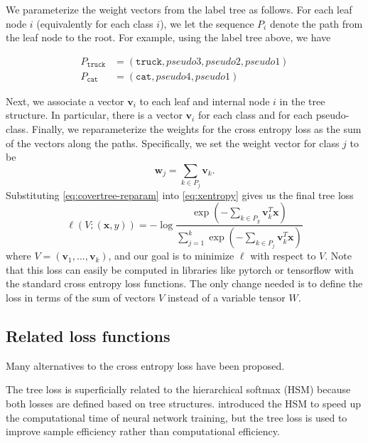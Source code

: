 \documentclass[twoside]{article}
\theoremstyle{definition}
\newcommand{\trans}[1]{{#1}^{T}}
\newcommand{\vv}{\mathbf v}
\newcommand{\w}{\mathbf w}
\newcommand{\x}{\mathbf x}
\begin{document}
We parameterize the weight vectors from the label tree as follows.
For each leaf node $i$ (equivalently for each class $i$),
we let the sequence $P_i$ denote the path from the leaf node to the root.
For example, using the label tree above,
we have

\begin{equation}
\begin{split}
    P_{\texttt{truck}} &= (\texttt{truck}, \textit{pseudo3}, \textit{pseudo2}, \textit{pseudo1} ) \\
    P_{\texttt{cat}} &= (\texttt{cat}, \textit{pseudo4}, \textit{pseudo1} )
\end{split}
\end{equation}


Next, we associate a vector $\vv_i$ to each leaf and internal node $i$ in the tree structure.
In particular, there is a vector $\vv_i$ for each class and for each pseudo-class.
Finally, we reparameterize the weights for the cross entropy loss as the sum of the vectors along the paths.
Specifically, we set the weight vector for class $j$ to be 
\begin{equation}
    \label{eq:covertree-reparam}
    \w_j = \sum_{k\in P_j} \vv_k
    .
\end{equation}
Substituting \eqref{eq:covertree-reparam} into \eqref{eq:xentropy} gives us the final tree loss
\begin{equation}
    \ell(V;(\x,y)) = - \log \frac {\exp(-\sum_{k\in P_y}\trans\vv_k \x)}{\sum_{j=1}^k \exp(- \sum_{k\in P_j}\trans\vv_k \x)}
\end{equation}
where $V=(\vv_1,...,\vv_k)$,
and our goal is to minimize $\ell$ with respect to $V$.
Note that this loss can easily be computed in libraries like pytorch or tensorflow with the standard cross entropy loss functions.
The only change needed is to define the loss in terms of the sum of vectors $V$ instead of a variable tensor $W$.

\subsection{Related loss functions}

Many alternatives to the cross entropy loss have been proposed.

The tree loss is superficially related to the hierarchical softmax (HSM) because both losses are defined based on tree structures.
\cite{morin2005hierarchical} introduced the HSM to speed up the computational time of neural network training,
but the tree loss is used to improve sample efficiency rather than computational efficiency.
\end{document}

